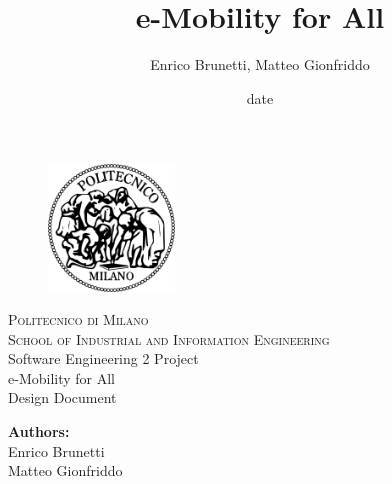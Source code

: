 \documentclass[a4paper]{report}
\begin{document}
\titleformat{\chapter}[hang]
{\normalfont\huge\bfseries}{\thechapter}{1em}{}

\title{e-Mobility for All}
\author{Enrico Brunetti, Matteo Gionfriddo}
\date{date} %

\begin{titlepage}
\begin{figure}[t]
\centering
\includegraphics[width=0.3\textwidth]{Logo}
\end{figure}
\begin{center}
    \textsc{ \LARGE{Politecnico di Milano \\}}
	\textsc{ \Large {School of Industrial and Information Engineering\\ }}
	\vspace{3mm}
	\textnormal{ \Large{Software Engineering 2 Project\\}}
	\vspace{30mm}
	\fontsize{10mm}{7mm}\selectfont
    \textup{e-Mobility for All}\\
    \textnormal{ \LARGE{Design Document\\}}
\end{center}

\vspace{18mm}

\begin{center}
    \textnormal{\large{\bf Authors:\\}}
	{\large Enrico Brunetti \\ Matteo Gionfriddo }
	\fontsize{10mm}{5mm}\selectfont
\end{center}
\vspace{15mm}


\end{titlepage}
\end{document}
